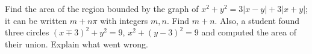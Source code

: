 Find the area of the region bounded by the graph of $x^2+y^2=3|x-y|+3|x+y|$; it can be written $m+n\pi$ with integers $m,n$. Find $m+n$. Also, a student found three circles $(x\mp3)^2+y^2=9$, $x^2+(y-3)^2=9$ and computed the area of their union. Explain what went wrong.
